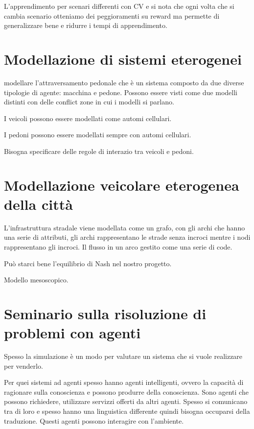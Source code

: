 L'apprendimento per scenari differenti con CV e si nota che ogni volta che si cambia 
scenario otteniamo dei peggioramenti su reward ma permette di generalizzare bene 
e ridurre i tempi di apprendimento.

\section{Modellazione di sistemi eterogenei}
modellare l'attraversamento pedonale che è un sistema composto da due diverse tipologie 
di agente: macchina e pedone. Possono essere visti come due modelli distinti con 
delle conflict zone in cui i modelli si parlano.

I veicoli possono essere modellati come automi cellulari.

I pedoni possono essere modellati sempre con automi cellulari.

Bisogna specificare delle regole di interazio tra veicoli e pedoni.

\section{Modellazione veicolare eterogenea della città}
L'infrastruttura stradale viene modellata come un grafo, con gli archi che hanno 
una serie di attributi, gli archi rappresentano le strade senza incroci mentre 
i nodi rappresentano gli incroci. Il flusso in un arco gestito come una serie di code.

\begin{nota}
      Può starci bene l'equilibrio di Nash nel nostro progetto.
\end{nota}


Modello mesoscopico.

\section{Seminario sulla risoluzione di problemi con agenti}
Spesso la simulazione è un modo per valutare un sistema che si vuole realizzare 
per venderlo.

Per quei sistemi ad agenti spesso hanno agenti intelligenti, ovvero la capacità di 
ragionare sulla conoscienza e possono produrre della conoscienza. Sono agenti 
che possono richiedere, utilizzare servizzi offerti da altri agenti. Spesso si 
comunicano tra di loro e spesso hanno una linguistica differente quindi bisogna 
occuparsi della traduzione. Questi agenti possono interagire con l'ambiente.

